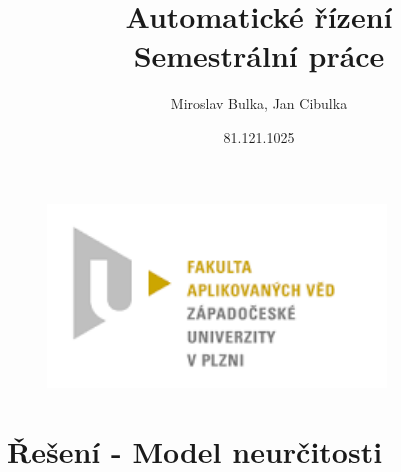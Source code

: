 \documentclass[a4paper,11pt]{article}
\title{Automatické řízení \\
	Semestrální práce}
\author{Miroslav Bulka, Jan Cibulka}
\date{81.121.1025}
\begin{document}
\maketitle

\begin{figure}[h]
	\centering
	\includegraphics[width=9cm]{obrazky/fav.png}
\end{figure}
\clearpage
\newpage



\newpage

\newpage

\tableofcontents
\newpage
\section{Řešení - Model neurčitosti}
\end{document}
